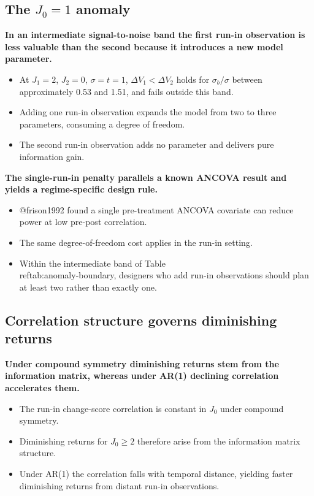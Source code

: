 \documentclass[
  11pt,
]{article}
\begin{document}
\subsection{\texorpdfstring{The \(J_0=1\) anomaly}{The J\_0=1 anomaly}}\label{the-j_01-anomaly}

\textbf{In an intermediate signal-to-noise band the first run-in observation is less valuable than the second because it introduces a new model parameter.}

\begin{itemize}\setlength{\itemsep}{2pt}\setlength{\parskip}{0pt}
\item At $J_1 = 2$, $J_2 = 0$, $\sigma = t = 1$, $\Delta V_1 < \Delta V_2$ holds for $\sigma_b / \sigma$ between approximately 0.53 and 1.51, and fails outside this band.
\item Adding one run-in observation expands the model from two to three parameters, consuming a degree of freedom.
\item The second run-in observation adds no parameter and delivers pure information gain.
\end{itemize}

\textbf{The single-run-in penalty parallels a known ANCOVA result and yields a regime-specific design rule.}

\begin{itemize}\setlength{\itemsep}{2pt}\setlength{\parskip}{0pt}
\item @frison1992 found a single pre-treatment ANCOVA covariate can reduce power at low pre-post correlation.
\item The same degree-of-freedom cost applies in the run-in setting.
\item Within the intermediate band of Table \\ref{tab:anomaly-boundary}, designers who add run-in observations should plan at least two rather than exactly one.
\end{itemize}

\subsection{Correlation structure governs diminishing returns}\label{correlation-structure-governs-diminishing-returns}

\textbf{Under compound symmetry diminishing returns stem from the information matrix, whereas under AR(1) declining correlation accelerates them.}

\begin{itemize}\setlength{\itemsep}{2pt}\setlength{\parskip}{0pt}
\item The run-in change-score correlation is constant in $J_0$ under compound symmetry.
\item Diminishing returns for $J_0 \ge 2$ therefore arise from the information matrix structure.
\item Under AR(1) the correlation falls with temporal distance, yielding faster diminishing returns from distant run-in observations.
\end{itemize}
\end{document}
